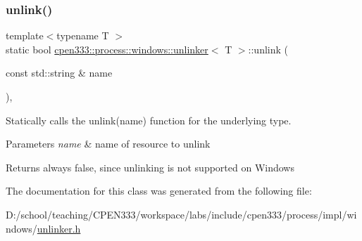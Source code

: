 \subsubsection{\texorpdfstring{unlink()}{unlink()}}
{\footnotesize\ttfamily template$<$typename T $>$ \\
static bool \hyperlink{classcpen333_1_1process_1_1windows_1_1unlinker}{cpen333\+::process\+::windows\+::unlinker}$<$ T $>$\+::unlink (\begin{DoxyParamCaption}\item[{const std\+::string \&}]{name }\end{DoxyParamCaption})\hspace{0.3cm}{\ttfamily [inline]}, {\ttfamily [static]}}



Statically calls the {\ttfamily unlink(name)} function for the underlying type. 


\begin{DoxyParams}{Parameters}
{\em name} & name of resource to unlink \\
\hline
\end{DoxyParams}
\begin{DoxyReturn}{Returns}
always {\ttfamily false}, since unlinking is not supported on Windows 
\end{DoxyReturn}


The documentation for this class was generated from the following file\+:\begin{DoxyCompactItemize}
\item 
D\+:/school/teaching/\+C\+P\+E\+N333/workspace/labs/include/cpen333/process/impl/windows/\hyperlink{impl_2windows_2unlinker_8h}{unlinker.\+h}\end{DoxyCompactItemize}
